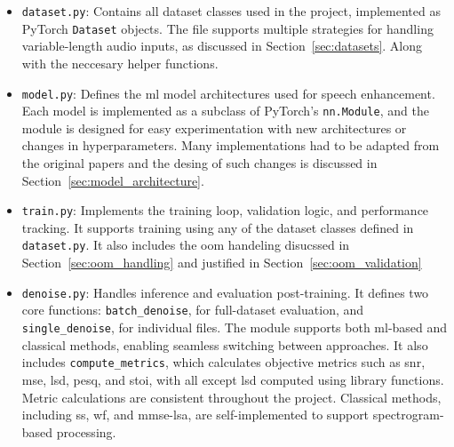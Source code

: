 \begin{itemize}
    \item \texttt{dataset.py}: Contains all dataset classes used in the project, implemented as PyTorch \texttt{Dataset} objects. The file supports multiple strategies for handling variable-length audio inputs, as discussed in Section~\ref{sec:datasets}. Along with the neccesary helper functions.

    \item \texttt{model.py}: Defines the \gls{ml} model architectures used for speech enhancement. Each model is implemented as a subclass of PyTorch’s \texttt{nn.Module}, and the module is designed for easy experimentation with new architectures or changes in hyperparameters. Many implementations had to be adapted from the original papers and the desing of such changes is discussed in Section~\ref{sec:model_architecture}.

    \item \texttt{train.py}: Implements the training loop, validation logic, and performance tracking. It supports training using any of the dataset classes defined in \texttt{dataset.py}. It also includes the \gls{oom} handeling disucssed in Section~\ref{sec:oom_handling} and justified in Section~\ref{sec:oom_validation}

    \item \texttt{denoise.py}: Handles inference and evaluation post-training. It defines two core functions: \texttt{batch\_denoise}, for full-dataset evaluation, and \texttt{single\_denoise}, for individual files. The module supports both \gls{ml}-based and classical methods, enabling seamless switching between approaches. It also includes \texttt{compute\_metrics}, which calculates objective metrics such as \gls{snr}, \gls{mse}, \gls{lsd}, \gls{pesq}, and \gls{stoi}, with all except \gls{lsd} computed using library functions. Metric calculations are consistent throughout the project. Classical methods, including \gls{ss}, \gls{wf}, and \gls{mmse-lsa}, are self-implemented to support spectrogram-based processing.

\end{itemize}
